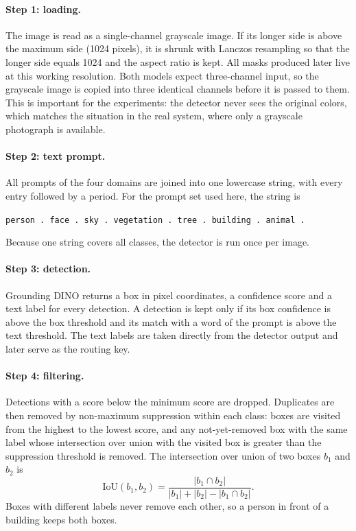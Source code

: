 \documentclass{FastFyp}
\begin{document}
\paragraph{Step 1: loading.} The image is read as a single-channel grayscale image. If its longer side is above the maximum side (1024 pixels), it is shrunk with Lanczos resampling so that the longer side equals 1024 and the aspect ratio is kept. All masks produced later live at this working resolution. Both models expect three-channel input, so the grayscale image is copied into three identical channels before it is passed to them. This is important for the experiments: the detector never sees the original colors, which matches the situation in the real system, where only a grayscale photograph is available.
 
\paragraph{Step 2: text prompt.} All prompts of the four domains are joined into one lowercase string, with every entry followed by a period. For the prompt set used here, the string is
\begin{center}
\texttt{person . face . sky . vegetation . tree . building . animal .}
\end{center}
Because one string covers all classes, the detector is run once per image.
 
\paragraph{Step 3: detection.} Grounding DINO returns a box in pixel coordinates, a confidence score and a text label for every detection. A detection is kept only if its box confidence is above the box threshold and its match with a word of the prompt is above the text threshold. The text labels are taken directly from the detector output and later serve as the routing key.
 
\paragraph{Step 4: filtering.} Detections with a score below the minimum score are dropped. Duplicates are then removed by non-maximum suppression within each class: boxes are visited from the highest to the lowest score, and any not-yet-removed box with the same label whose intersection over union with the visited box is greater than the suppression threshold is removed. The intersection over union of two boxes $b_1$ and $b_2$ is
\begin{equation}
\mathrm{IoU}(b_1,b_2)=\frac{|b_1\cap b_2|}{|b_1|+|b_2|-|b_1\cap b_2|}.
\end{equation}
Boxes with different labels never remove each other, so a person in front of a building keeps both boxes.
 
\end{document}
